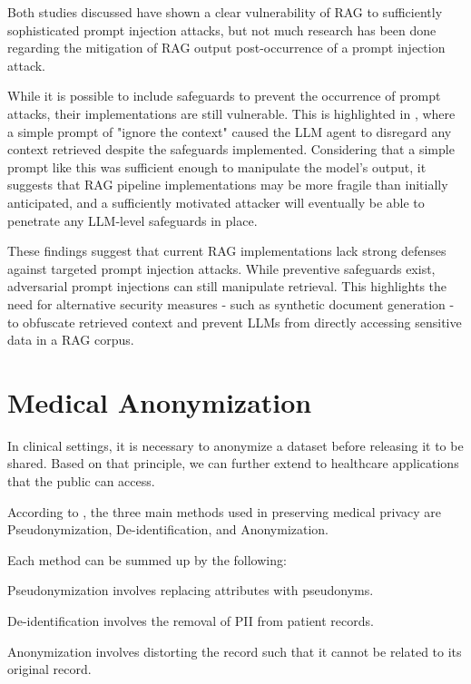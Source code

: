 Both studies discussed have shown a clear vulnerability of RAG to sufficiently sophisticated prompt injection attacks, but not much research has been done regarding the mitigation of RAG output post-occurrence of a prompt injection attack.

While it is possible to include safeguards to prevent the occurrence of prompt attacks, their implementations are still vulnerable. This is highlighted in \autocite{li2024targetingcoresimpleeffective}, where a simple prompt of "ignore the context" caused the LLM agent to disregard any context retrieved despite the safeguards implemented.
Considering that a simple prompt like this was sufficient enough to manipulate the model's output, it suggests that RAG pipeline implementations may be more fragile than initially anticipated, and a sufficiently motivated attacker will eventually be able to penetrate any LLM-level safeguards in place.

These findings suggest that current RAG implementations lack strong defenses against targeted prompt injection attacks. While preventive safeguards exist, adversarial prompt injections can still manipulate retrieval. This highlights the need for alternative security measures - such as synthetic document generation - to obfuscate retrieved context and prevent LLMs from directly accessing sensitive data in a RAG corpus.

\section{Medical Anonymization}
In clinical settings, it is necessary to anonymize a dataset before releasing it to be shared. Based on that principle, we can further extend to healthcare applications that the public can access.

According to \autocite{Rodriguez_Tuck_Dozier_Lewis_Eldridge_Jackson_Murray_Weir_2022}, the three main methods used in preserving medical privacy are Pseudonymization, De-identification, and Anonymization.

Each method can be summed up by the following:

Pseudonymization involves replacing attributes with pseudonyms.

De-identification involves the removal of PII from patient records.

Anonymization involves distorting the record such that it cannot be related to its original record.

